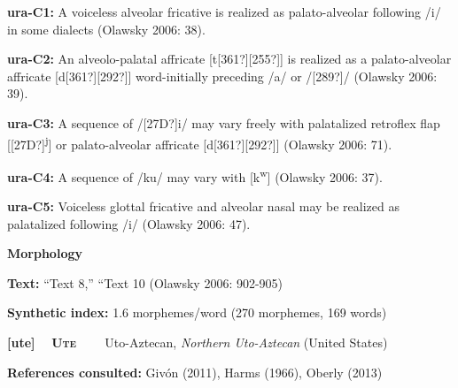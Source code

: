 \begin{styleBody}
\textbf{ura-C1: }A voiceless alveolar fricative is realized as palato-alveolar following /i/ in some dialects (Olawsky 2006: 38).
\end{styleBody}

\begin{styleBody}
\textbf{ura-C2: }An alveolo-palatal affricate [t[361?][255?]] is realized as a palato-alveolar affricate [d[361?][292?]] word-initially preceding /a/ or /[289?]/ (Olawsky 2006: 39).
\end{styleBody}

\begin{styleBody}
\textbf{ura-C3: }A sequence of /[27D?]i/ may vary freely with palatalized retroflex flap [[27D?]\textsuperscript{j}] or palato-alveolar affricate [d[361?][292?]] (Olawsky 2006: 71).
\end{styleBody}

\begin{styleBody}
\textbf{ura-C4: }A sequence of /ku/ may vary with [k\textsuperscript{w}] (Olawsky 2006: 37).
\end{styleBody}

\begin{styleBody}
\textbf{ura-C5: }Voiceless glottal fricative and alveolar nasal may be realized as palatalized following /i/ (Olawsky 2006: 47).
\end{styleBody}

\begin{styleBody}
\textbf{Morphology}
\end{styleBody}

\begin{styleBody}
\textbf{Text:} “Text 8,” “Text 10 (Olawsky 2006: 902-905)
\end{styleBody}

\begin{styleBody}
\textbf{Synthetic index: }1.6 morphemes/word (270 morphemes, 169 words)
\end{styleBody}

\clearpage\begin{styleBody}
\textbf{[ute] }\ \ \textbf{\textsc{Ute\ \ }}\textbf{\ \ }Uto-Aztecan, \textit{Northern Uto-Aztecan} (United States)
\end{styleBody}

\begin{styleBody}
\textbf{References consulted: }Givón (2011), Harms (1966), Oberly (2013)
\end{styleBody}

